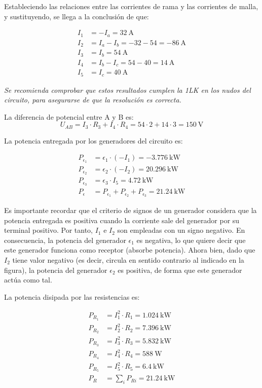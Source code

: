 Estableciendo las relaciones entre las corrientes de rama y las
corrientes de malla, y sustituyendo, se llega a la conclusión de que:

\begin{align*}
  I_1 &= -I_a=\qty{32}{\ampere}\\
  I_2 &= I_a - I_b=-32-54=\qty{-86}{\ampere}\\
  I_3 &= I_b=\qty{54}{\ampere}\\
  I_4 &= I_b - I_c=54-40=\qty{14}{\ampere}\\
  I_5 &= I_c=\qty{40}{\ampere}
\end{align*}

\emph{Se recomienda comprobar que estos resultados cumplen la 1LK en
  los nudos del circuito, para asegurarse de que la resolución es
  correcta.}

La diferencia de potencial entre A y B es:
\begin{equation*}
  U_{AB} = I_3 \cdot R_3 + I_4 \cdot R_4 = 54\cdot 2+14\cdot 3= \qty{150}{\volt}
\end{equation*}

La potencia entregada por los generadores del circuito es:

\begin{align*}
  P_{\epsilon_1} &= \epsilon_1 \cdot (-I_1) = -\qty{3,776}{\kilo\watt}\\
  P_{\epsilon_2} &= \epsilon_2 \cdot (-I_2) = \qty{20,296}{\kilo\watt}\\
  P_{\epsilon_3} &= \epsilon_3 \cdot I_5 = \qty{4,72}{\kilo\watt}\\
  P_\epsilon &= P_{\epsilon_1} + P_{\epsilon_2} + P_{\epsilon_3} = \qty{21,24}{\kilo\watt}  
\end{align*}

Es importante recordar que el criterio de signos de un generador considera que la potencia entregada es positiva cuando la corriente sale del generador por su terminal positivo. Por tanto, $I_1$ e $I_2$ son empleadas con un signo negativo. En consecuencia, la potencia del generador $\epsilon_1$ es negativa, lo que quiere decir que este generador funciona como receptor (absorbe potencia). Ahora bien, dado que $I_2$ tiene valor negativo (es decir, circula en sentido contrario al indicado en la figura), la potencia del generador $\epsilon_2$ es positiva, de forma que este generador actúa como tal.

La potencia disipada por las resistencias es:

\begin{align*}
  P_{R_1} &= I_1^2 \cdot R_1 = \qty{1,024}{\kilo\watt}\\
  P_{R_2} &= I_2^2 \cdot R_2 = \qty{7,396}{\kilo\watt}\\
  P_{R_3} &= I_3^2 \cdot R_3 = \qty{5,832}{\kilo\watt}\\
  P_{R_4} &= I_4^2 \cdot R_4 = \qty{588}{\watt}\\
  P_{R_5} &= I_5^2 \cdot R_5 = \qty{6,4}{\kilo\watt}\\
  P_R &= \sum_i P_{Ri} = \qty{21,24}{\kilo\watt}  
\end{align*}

